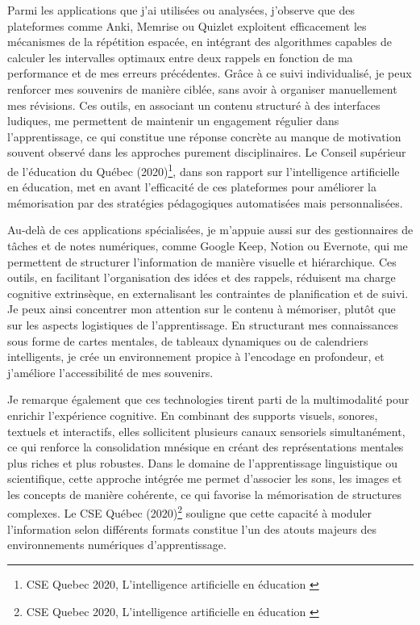 \documentclass[11pt,a4paper]{report}
\begin{document}
Parmi les applications que j’ai utilisées ou analysées, j’observe que des plateformes comme Anki, Memrise ou Quizlet exploitent efficacement les mécanismes de la répétition espacée, en intégrant des algorithmes capables de calculer les intervalles optimaux entre deux rappels en fonction de ma performance et de mes erreurs précédentes. Grâce à ce suivi individualisé, je peux renforcer mes souvenirs de manière ciblée, sans avoir à organiser manuellement mes révisions. Ces outils, en associant un contenu structuré à des interfaces ludiques, me permettent de maintenir un engagement régulier dans l’apprentissage, ce qui constitue une réponse concrète au manque de motivation souvent observé dans les approches purement disciplinaires. Le Conseil supérieur de l’éducation du Québec (2020)\footnote{CSE Quebec 2020, L’intelligence artificielle en éducation \cite{hypotheses}}, dans son rapport sur l’intelligence artificielle en éducation, met en avant l’efficacité de ces plateformes pour améliorer la mémorisation par des stratégies pédagogiques automatisées mais personnalisées.

Au-delà de ces applications spécialisées, je m’appuie aussi sur des gestionnaires de tâches et de notes numériques, comme Google Keep, Notion ou Evernote, qui me permettent de structurer l’information de manière visuelle et hiérarchique. Ces outils, en facilitant l’organisation des idées et des rappels, réduisent ma charge cognitive extrinsèque, en externalisant les contraintes de planification et de suivi. Je peux ainsi concentrer mon attention sur le contenu à mémoriser, plutôt que sur les aspects logistiques de l’apprentissage. En structurant mes connaissances sous forme de cartes mentales, de tableaux dynamiques ou de calendriers intelligents, je crée un environnement propice à l’encodage en profondeur, et j’améliore l’accessibilité de mes souvenirs.

Je remarque également que ces technologies tirent parti de la multimodalité pour enrichir l’expérience cognitive. En combinant des supports visuels, sonores, textuels et interactifs, elles sollicitent plusieurs canaux sensoriels simultanément, ce qui renforce la consolidation mnésique en créant des représentations mentales plus riches et plus robustes. Dans le domaine de l’apprentissage linguistique ou scientifique, cette approche intégrée me permet d’associer les sons, les images et les concepts de manière cohérente, ce qui favorise la mémorisation de structures complexes. Le CSE Québec (2020)\footnote{CSE Quebec 2020, L’intelligence artificielle en éducation \cite{hypotheses}} souligne que cette capacité à moduler l'information selon différents formats constitue l’un des atouts majeurs des environnements numériques d’apprentissage.
\end{document}

